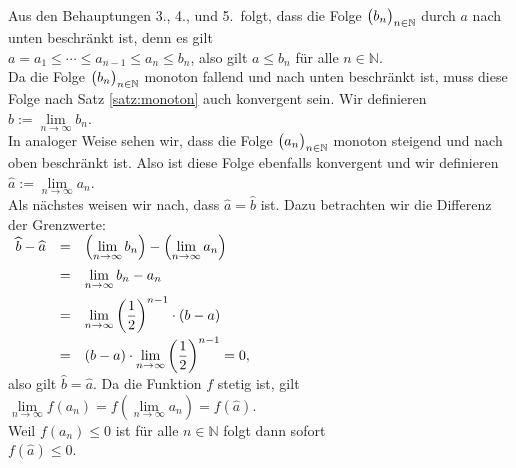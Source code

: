 Aus den Behauptungen 3., 4., und 5.~folgt, dass die Folge $\bigl(b_n\bigr)_{n\in\mathbb{N}}$ durch $a$ nach unten
beschr\"ankt ist, denn es gilt
\\[0.2cm]
\hspace*{1.3cm} $a = a_1 \leq \cdots \leq a_{n-1} \leq a_n \leq b_n$, \quad
                also gilt $a \leq b_n$ f\"ur alle $n\in\mathbb{N}$.
 \\[0.2cm]
Da die Folge $\bigl(b_n\bigr)_{n\in\mathbb{N}}$ monoton fallend und nach unten beschr\"ankt ist, muss diese Folge
nach Satz \ref{satz:monoton} auch konvergent sein.  Wir definieren
\\[0.2cm]
\hspace*{1.3cm}
$\widehat{b} := \lim\limits_{n\rightarrow\infty} b_n$.
\\[0.2cm]
In analoger Weise sehen wir, dass die Folge $\bigl(a_n\bigr)_{n\in\mathbb{N}}$ monoton steigend und nach oben
beschr\"ankt ist.  Also ist diese Folge ebenfalls konvergent und wir definieren
\\[0.2cm]
\hspace*{1.3cm}
$\widehat{a} := \lim\limits_{n\rightarrow\infty} a_n$.
\\[0.2cm]
Als n\"achstes weisen wir nach, dass $\widehat{a} = \widehat{b}$ ist.  Dazu betrachten wir
die Differenz der Grenzwerte: 
\\[0.2cm]
\hspace*{1.3cm}
$
\begin{array}[t]{lcl}  
\widehat{b} - \widehat{a} & = &
 \displaystyle\left(\lim\limits_{n\rightarrow\infty} b_n\right) - \left(\lim\limits_{n\rightarrow\infty} a_n\right) \\[0.3cm]
& = & \displaystyle\lim\limits_{n\rightarrow\infty} b_n - a_n \\[0.3cm]
& = & \displaystyle\lim\limits_{n\rightarrow\infty} \left(\frac{1}{2}\right)^{n-1} \cdot (b-a) \\[0.3cm]
& = & \displaystyle (b-a) \cdot \lim\limits_{n\rightarrow\infty} \left(\frac{1}{2}\right)^{n-1} = 0,
\end{array}
$
\\[0.2cm]
also gilt $\widehat{b} = \widehat{a}$. Da die Funktion $f$ stetig ist, gilt
\\[0.2cm]
\hspace*{1.3cm}
$\lim\limits_{n\rightarrow\infty} f(a_n) = f\left(\lim\limits_{n\rightarrow\infty} a_n\right) = f(\widehat{a})$.
\\[0.31cm]
Weil $f(a_n) \leq 0$ ist f\"ur alle $n\in\mathbb{N}$ folgt dann sofort
\\[0.2cm]
\hspace*{1.3cm}
$f(\widehat{a}) \leq 0$.
